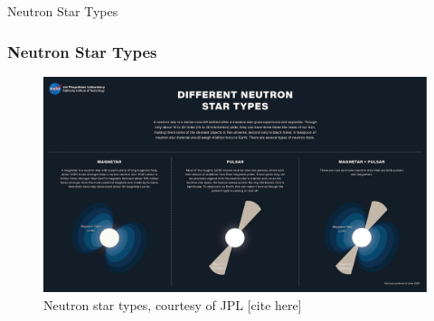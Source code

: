 \documentclass[hyperref=pdftex, presentation]{beamer}
\begin{document}
\begin{frame}{\Large Neutron Star Types}
\frametitle{\Large Neutron Star Types}

\begin{figure}
	\includegraphics[scale=.17]{figures/neutron_star_types.jpg}
	\caption{Neutron star types, courtesy of JPL [cite here]}
\end{figure}

\end{frame}

\end{document}
